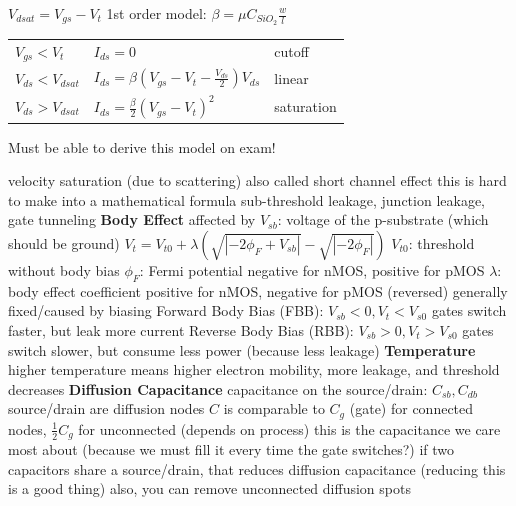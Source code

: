 \documentclass[12pt]{article}
\begin{document}
\begin{spacing}{0.8}
\begin{multicols*}{2}
\begin{flushleft}
\begin{outline}[longenum]
  \1 $V_{dsat}=V_{gs}-V_t$
  \1 1st order model: $\beta=\mu C_{SiO_2}\frac{w}{l}$
  \begin{tabular}{l l l}
  $V_{gs} < V_t     $ & $I_{ds}=0$                                        & cutoff  \\
  $V_{ds} < V_{dsat}$ & $I_{ds}=\beta(V_{gs}-V_t-\frac{V_{ds}}{2})V_{ds}$ & linear \\
  $V_{ds} > V_{dsat}$ & $I_{ds}=\frac{\beta}{2}(V_{gs}-V_t)^2$            & saturation  \\
  \end{tabular}
  \1 Must be able to derive this model on exam!

  \1 velocity saturation (due to scattering)
    \2 also called short channel effect
    \2 this is hard to make into a mathematical formula
  \1 sub-threshold leakage, junction leakage, gate tunneling
  \1 \textbf{Body Effect}
    \2 affected by $V_{sb}$: voltage of the p-substrate (which should be ground)
    \2 $V_t=V_{t0}+\lambda(\sqrt{|-2\phi_F+V_{sb}|}-\sqrt{|-2\phi_F|})$
      \3 $V_{t0}$: threshold without body bias
      \3 $\phi_F$: Fermi potential
        \4 negative for nMOS, positive for pMOS
      \3 $\lambda$: body effect coefficient
        \4 positive for nMOS, negative for pMOS (reversed)
    \2 generally fixed/caused by biasing
    \2 Forward Body Bias (FBB):
      \3 $V_{sb}<0, V_t<V_{s0}$
      \3 gates switch faster, but leak more current
    \2 Reverse Body Bias (RBB):
      \3 $V_{sb}>0, V_t>V_{s0}$
      \3 gates switch slower, but consume less power (because less leakage)
  \1 \textbf{Temperature}
    \2 higher temperature means higher electron mobility, more leakage, and threshold decreases
  \1 \textbf{Diffusion Capacitance}
    \2 capacitance on the source/drain: $C_{sb}, C_{db}$
      \3 source/drain are diffusion nodes
      \3 $C$ is comparable to $C_g$ (gate) for connected nodes, $\frac{1}{2}C_g$ for unconnected
      \3 (depends on process)
    \2 this is the capacitance we care most about (because we must fill it every time the gate switches?)
    \2 if two capacitors share a source/drain, that reduces diffusion capacitance (reducing this is a good thing)
    \2 also, you can remove unconnected diffusion spots


\end{outline}
\end{flushleft}
\end{multicols*}
\end{spacing}
\end{document}
